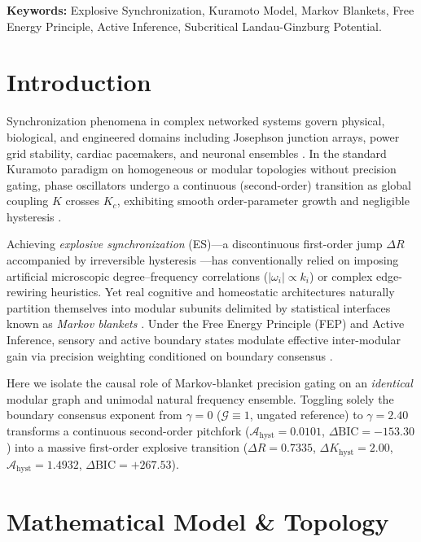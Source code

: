 \documentclass[11pt,a4paper]{article}
\begin{document}
\vspace{0.45cm}
\noindent\textbf{Keywords:} Explosive Synchronization, Kuramoto Model, Markov Blankets, Free Energy Principle, Active Inference, Subcritical Landau-Ginzburg Potential.

\section{Introduction}
Synchronization phenomena in complex networked systems govern physical, biological, and engineered domains including Josephson junction arrays, power grid stability, cardiac pacemakers, and neuronal ensembles \cite{Kuramoto1975, Strogatz2000, Arenas2008, Pikovsky2003}. In the standard Kuramoto paradigm on homogeneous or modular topologies without precision gating, phase oscillators undergo a continuous (second-order) transition as global coupling $K$ crosses $K_c$, exhibiting smooth order-parameter growth and negligible hysteresis \cite{Strogatz2000}.

Achieving \emph{explosive synchronization} (ES)---a discontinuous first-order jump $\Delta R$ accompanied by irreversible hysteresis \cite{GomezGardenes2011, Boccaletti2016}---has conventionally relied on imposing artificial microscopic degree--frequency correlations ($|\omega_i| \propto k_i$) \cite{GomezGardenes2011, Leyva2012} or complex edge-rewiring heuristics. Yet real cognitive and homeostatic architectures naturally partition themselves into modular subunits delimited by statistical interfaces known as \emph{Markov blankets} \cite{Pearl1988, Friston2019}. Under the Free Energy Principle (FEP) and Active Inference, sensory and active boundary states modulate effective inter-modular gain via precision weighting conditioned on boundary consensus \cite{Friston2019}.

Here we isolate the causal role of Markov-blanket precision gating on an \emph{identical} modular graph and unimodal natural frequency ensemble. Toggling solely the boundary consensus exponent from $\gamma = 0$ ($\mathcal{G} \equiv 1$, ungated reference) to $\gamma = 2.40$ transforms a continuous second-order pitchfork ($\mathcal{A}_{\mathrm{hyst}} = 0.0101$, $\Delta\mathrm{BIC} = -153.30$) into a massive first-order explosive transition ($\Delta R = 0.7335$, $\Delta K_{\mathrm{hyst}} = 2.00$, $\mathcal{A}_{\mathrm{hyst}} = 1.4932$, $\Delta\mathrm{BIC} = +267.53$).

\section{Mathematical Model \& Topology}
\end{document}
